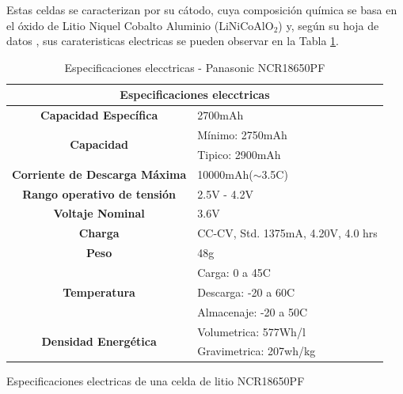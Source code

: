 \documentclass[10pt,a4paper]{article}
\begin{document}
    Estas celdas se caracterizan por su cátodo, cuya composición 
    química se basa en el óxido de Litio Niquel Cobalto Aluminio 
    ($\mathrm{LiNiCoAlO_2}$) y, según su hoja de datos 
    \cite{18650_datasheet}, sus carateristicas electricas se 
    pueden observar en la Tabla \ref{table:ncr}.
    \newpage
	\begin{table}[h]
		\begin{center}
			\begin{tabular}{|c|l|}
				\hline
                \multicolumn{2}{|c|}{Especificaciones elecctricas}                          \\ \hline
				\textbf{Capacidad Específica}                 & 2700mAh                            \\ \hline
				\multirow{2}{*}{\textbf{Capacidad}}           & Mínimo: 2750mAh                    \\ \cline{2-2} 
				& Tipico: 2900mAh                    \\ \hline
				\textbf{Corriente de Descarga Máxima}         & 10000mAh($\sim$3.5C)               \\ \hline
				\textbf{Rango operativo de tensión}           & 2.5V - 4.2V                        \\ \hline
				\textbf{Voltaje Nominal}                      & 3.6V                               \\ \hline
				\textbf{Charga}                               & CC-CV, Std. 1375mA, 4.20V, 4.0 hrs \\ \hline
				\textbf{Peso}                                 & 48g                              \\ \hline
				\multirow{3}{*}{\textbf{Temperatura}}         & Carga: 0 a 45C                     \\ \cline{2-2} 
				& Descarga: -20 a 60C                \\ \cline{2-2} 
				& Almacenaje: -20 a 50C              \\ \hline
				\multirow{2}{*}{\textbf{Densidad Energética}} & Volumetrica: 577Wh/l               \\ \cline{2-2} 
				& Gravimetrica: 207wh/kg             \\ \hline
			\end{tabular}%
            \caption{Especificaciones electricas de una celda de litio NCR18650PF}
            \label{ncr_table}
		\end{center}
        \caption{Especificaciones elecctricas - Panasonic NCR18650PF}
        \label{table:ncr}
	\end{table}
	
\end{document}
